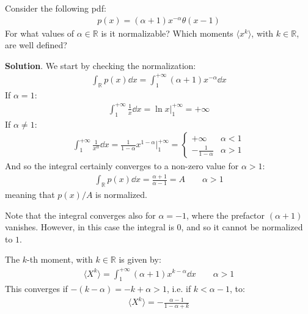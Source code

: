 \documentclass[../../main.tex]{subfiles}
\begin{document}
\begin{exo}
    Consider the following pdf:
    \begin{align*}
        p(x) = (\alpha + 1) x^{-\alpha} \theta(x-1)
    \end{align*}
    For what values of $\alpha \in \mathbb{R}$ is it normalizable? Which moments $\langle x^k \rangle$, with $k \in \mathbb{R}$, are well defined?
    
    \medskip

    \textbf{Solution}. We start by checking the normalization:
    \begin{align*}
        \int_{\mathbb{R}} p(x) \dd{x} = \int_1^{+\infty} (\alpha + 1) x^{-\alpha} \dd{x}
    \end{align*} 
    If $\alpha =1$:
    \begin{align*}
        \int_{1}^{+\infty} \frac{1}{x} \dd{x} = \ln x \Big|_1^{+\infty} = +\infty 
    \end{align*}
    If $\alpha \neq 1$:
    \begin{align*}
        \int_1^{+\infty} \frac{1}{x^\alpha} \dd{x} = \frac{1}{1 - \alpha} x^{1 - \alpha} \Big|_{1}^{+\infty} = \begin{cases}
            +\infty & \alpha < 1\\
            -\frac{1}{1-\alpha} & \alpha > 1
        \end{cases}
    \end{align*}
    And so the integral certainly converges to a non-zero value for $\alpha > 1$:
    \begin{align*}
        \int_{\mathbb{R}} p(x) \dd{x} = \frac{\alpha+1}{\alpha-1} = A  \qquad \alpha > 1
    \end{align*}
    meaning that $p(x)/A$ is normalized.

    \medskip

    Note that the integral converges also for $\alpha = -1$, where the prefactor $(\alpha + 1)$ vanishes. However, in this case the integral is $0$, and so it cannot be normalized to $1$.

    \medskip

    The $k$-th moment, with $k \in \mathbb{R}$ is given by:
    \begin{align*}
        \langle X^k \rangle = \int_1^{+\infty} (\alpha+1) x^{k - \alpha} \dd{x} \qquad \alpha > 1
    \end{align*}
    This converges if $-(k-\alpha) = -k + \alpha > 1$, i.e. if $k < \alpha-1$, to:
    \begin{align*}
        \langle X^k \rangle = -\frac{\alpha -1}{1-\alpha +k} 
    \end{align*}
\end{exo}
\end{document}
